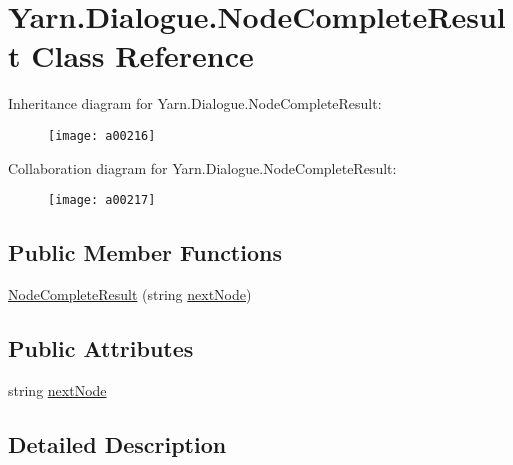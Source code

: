 \hypertarget{a00055}{\section{Yarn.\-Dialogue.\-Node\-Complete\-Result Class Reference}
\label{a00055}
}


Inheritance diagram for Yarn.\-Dialogue.\-Node\-Complete\-Result\-:
\nopagebreak
\begin{figure}[H]
\begin{center}
\leavevmode
\texttt{[image: a00216]}
\end{center}
\end{figure}


Collaboration diagram for Yarn.\-Dialogue.\-Node\-Complete\-Result\-:
\nopagebreak
\begin{figure}[H]
\begin{center}
\leavevmode
\texttt{[image: a00217]}
\end{center}
\end{figure}
\subsection*{Public Member Functions}
\begin{DoxyCompactItemize}
\item 
\hyperlink{a00055_a88c81469a69987c05aa92780c5a5c1f9}{Node\-Complete\-Result} (string \hyperlink{a00055_ad48b37b51066b94cd48c58626ac0e774}{next\-Node})
\end{DoxyCompactItemize}
\subsection*{Public Attributes}
\begin{DoxyCompactItemize}
\item 
string \hyperlink{a00055_ad48b37b51066b94cd48c58626ac0e774}{next\-Node}
\end{DoxyCompactItemize}


\subsection{Detailed Description}


